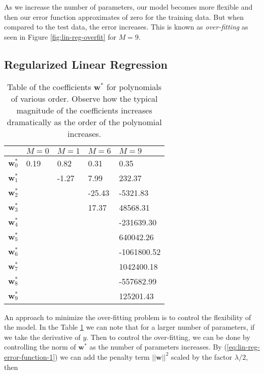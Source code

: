 \documentclass[11pt]{article} %
\begin{document}
As we increase the number of parameters, our model becomes more flexible and then our error function approximates of zero for the training data. But when compared to the test data, the error increases. This is known as \textit{over-fitting} as seen in Figure \ref{fig:lin-reg-overfit} for $M=9$.

\subsection{Regularized Linear Regression}

\begin{table}[h]
   \centering
   \begin{tabular}{l| l l l l}
     & $M=0$ & $M=1$ & $M=6$ & $M=9$ \\
   \hline
   $\mathbf{w}_0^*$ & 0.19 & 0.82   & 0.31   & 0.35\\
   $\mathbf{w}_1^*$ &      & -1.27  & 7.99   & 232.37\\
   $\mathbf{w}_2^*$ &      &        & -25.43 & -5321.83\\
   $\mathbf{w}_3^*$ &      &        & 17.37  & 48568.31\\
   $\mathbf{w}_4^*$ &      &        &        & -231639.30\\
   $\mathbf{w}_5^*$ &      &        &        & 640042.26\\
   $\mathbf{w}_6^*$ &      &        &        & -1061800.52\\
   $\mathbf{w}_7^*$ &      &        &        & 1042400.18\\
   $\mathbf{w}_8^*$ &      &        &        & -557682.99\\
   $\mathbf{w}_9^*$ &      &        &        & 125201.43\\
   \end{tabular}
   \caption{Table of the coefficients $\mathbf{w}^*$ for polynomials of various order. Observe how the typical magnitude of the coefficients increases dramatically as the order of the polynomial increases.}
   \label{tab:reg-lin-reg-weights}
   \end{table}

An approach to minimize the over-fitting problem is to control the flexibility of the model. In the Table \ref{tab:reg-lin-reg-weights} we can note that for a larger number of parameters, if we take the derivative of $y$. Then to control the over-fitting, we can be done by controlling the norm of $\mathbf{w}^*$ as the number of parameters increases. By (\ref{eq:lin-reg-error-function-1}) we can add the penalty term $||\mathbf{w}||^2 $ scaled by the factor $\lambda / 2$, then
\end{document}
